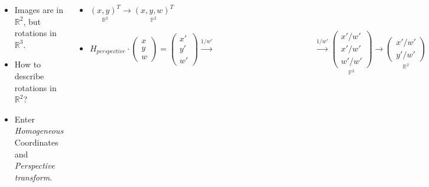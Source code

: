 \documentclass[9pt]{beamer}
\begin{document}
\begin{frame}
	\begin{columns}
		\begin{itemize}
			\item Images are in $\mathbb{R}^2$, but rotations in $\mathbb{R}^3$.
			\item How to describe rotations in $\mathbb{R}^2$?\\
			\item Enter \emph{Homogeneous} Coordinates and \emph{Perspective transform}.
		\end{itemize}
		\begin{itemize}
			\item $\underset{\mathbb{R}^2}{(x,y)^T} \rightarrow \underset{\mathbb{P}^2}{(x,y,w)^T}$
			\item $H_{perspective} 
				\cdot 
				\begin{pmatrix} 
					x \\ 
					y \\
					w 
				\end{pmatrix}=
				\begin{pmatrix} 
					x' \\
					y' \\
					w'
				\end{pmatrix} 
				\overset{1/w'}{\rightarrow} 
				\qquad 
				\qquad 
				\qquad 
				\qquad 
				\qquad 
				\qquad 
				\overset{1/w'}{\rightarrow} 
				\underset{\mathbb{P}^2}{
					\begin{pmatrix} 
						x'/w' \\
						x'/w'\\
						w'/w'
					\end{pmatrix}}
					\rightarrow 
					\underset{\mathbb{R}^2}{
						\begin{pmatrix} 
							x'/w' \\
							y'/w' 
						\end{pmatrix}}$
		\end{itemize}
	\end{columns}
\end{frame}
\end{document}
